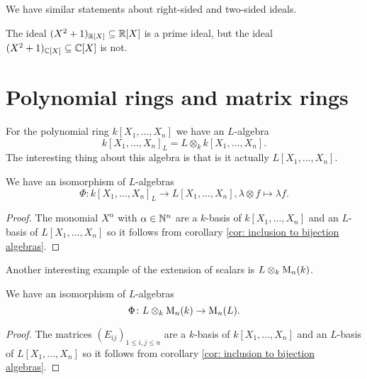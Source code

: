 \begin{rem}
  We have similar statements about right-sided and two-sided ideals.
\end{rem}


\begin{warn}
  The ideal $(X^2+1)_{\mathbb{R}[X]} \subseteq \mathbb{R}[X]$ is a prime ideal, but the ideal \mbox{$(X^2+1)_{\mathbb{C}[X]} \subseteq \mathbb{C}[X]$} is not.
\end{warn}






\section{Polynomial rings and matrix rings}


For the polynomial ring $k[X_1, \dotsc, X_n]$ we have an $L$-algebra
\[
    k[X_1, \dotsc, X_n]_L
  = L \otimes_k k[X_1, \dotsc, X_n].
\]
The interesting thing about this algebra is that is it actually $L[X_1, \dotsc, X_n]$.


\begin{prop}
  We have an isomorphism of $L$-algebras
  \[
            \Phi
    \colon  k[X_1, \dotsc, X_n]_L
    \to     L[X_1, \dotsc, X_n],
            \lambda \otimes f
    \mapsto \lambda f.
  \]
\end{prop}
\begin{proof}
  The monomial $X^\alpha$ with $\alpha \in \mathbb{N}^n$ are a $k$-basis of $k[X_1, \dotsc, X_n]$ and an $L$-basis of $L[X_1, \dotsc, X_n]$ so it follows from corollary \ref{cor: inclusion to bijection algebras}.
\end{proof}


Another interesting example of the extension of scalars is $L \otimes_k \operatorname{M}_n(k)$.


\begin{prop}
  We have an isomorphism of $L$-algebras
  \[
    \Phi \colon L \otimes_k \operatorname{M}_n(k) \to \operatorname{M}_n(L).
  \]
\end{prop}
\begin{proof}
  The matrices $(E_{ij})_{1 \leq i,j \leq n}$ are a $k$-basis of $k[X_1, \dotsc, X_n]$ and an $L$-basis of $L[X_1, \dotsc, X_n]$ so it follows from corollary \ref{cor: inclusion to bijection algebras}.
\end{proof}




